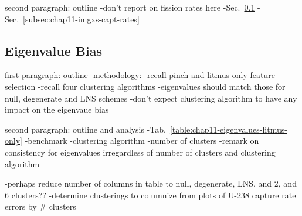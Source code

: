 second paragraph: outline
-don't report on fission rates here
-Sec.~\ref{subsec:chap11-imgxs-eigenvalue-bias}
-Sec.~\ref{subsec:chap11-imgxs-capt-rates}

\subsection{Eigenvalue Bias}
\label{subsec:chap11-imgxs-eigenvalue-bias}

first paragraph: outline
-methodology:
  -recall pinch and litmus-only feature selection
  -recall four clustering algorithms
-eigenvalues should match those for null, degenerate and LNS schemes
  -don't expect clustering algorithm to have any impact on the eigenvaue bias

second paragraph: outline and analysis
-Tab.~\ref{table:chap11-eigenvalues-litmus-only}
  -benchmark
  -clustering algorithm
  -number of clusters
-remark on consistency for eigenvalues irregardless of number of clusters and clustering algorithm

-perhaps reduce number of columns in table to null, degenerate, LNS, and 2, and 6 clusters??
  -determine clusterings to columnize from plots of U-238 capture rate errors by \# clusters

